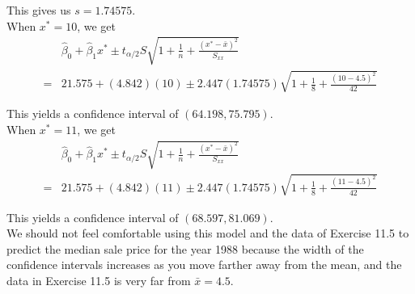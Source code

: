 \documentclass[12pt]{article}
\begin{document}
This gives us $s = 1.74575$.\\

When $x^* = 10$, we get
\begin{align*}
	&\hat{\beta}_0 + \hat{\beta}_1x^* \pm t_{\alpha/2}S\sqrt{1 + \frac{1}{n} + \frac{(x^* - \bar{x})^2}{S_{xx}}}\\
	= &21.575 + (4.842)(10) \pm 2.447(1.74575)\sqrt{1 + \frac{1}{8} + \frac{(10 - 4.5)^2}{42}}
\end{align*}

This yields a confidence interval of $(64.198, 75.795)$.\\

When $x^* = 11$, we get
\begin{align*}
	&\hat{\beta}_0 + \hat{\beta}_1x^* \pm t_{\alpha/2}S\sqrt{1 + \frac{1}{n} + \frac{(x^* - \bar{x})^2}{S_{xx}}}\\
	= &21.575 + (4.842)(11) \pm 2.447(1.74575)\sqrt{1 + \frac{1}{8} + \frac{(11 - 4.5)^2}{42}}
\end{align*}

This yields a confidence interval of $(68.597, 81.069)$.\\

We should not feel comfortable using this model and the data of Exercise 11.5 to predict the median sale price for the year 1988 because the width of the confidence intervals increases as you move farther away from the mean, and the data in Exercise 11.5 is very far from $\bar{x} = 4.5$.
\end{document}
